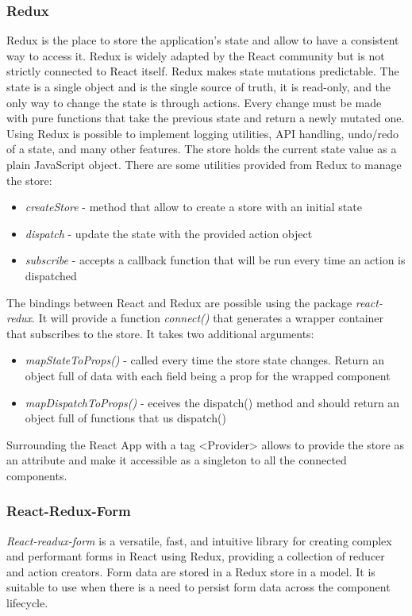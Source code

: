 \subsubsection*{Redux}
Redux is the place to store the application's state and allow to have a consistent way to access it. Redux is widely adapted by the React community but is not strictly connected to React itself. Redux makes state mutations predictable.
The state is a single object and is the single source of truth, it is read-only, and the only way to change the state is through actions. Every change must be made with pure functions that take the previous state and return a newly mutated one.
Using Redux is possible to implement logging utilities, API handling, undo/redo of a state, and many other features.  
The store holds the current state value as a plain JavaScript object. There are some utilities provided from Redux to manage the store:
\begin{itemize}
    \item \textit{createStore} - method that allow to create a store with an initial state
    \item \textit{dispatch} - update the state with the provided action object
    \item \textit{subscribe} - accepts a callback function that will be run every time an action is dispatched
\end{itemize}

The bindings between React and Redux are possible using the package \textit{react-redux}. It will provide a function \textit{connect()} that generates a wrapper container that subscribes to the store. It takes two additional arguments:
\begin{itemize}
    \item \textit{mapStateToProps()} - called every time the store state changes. Return an object full of data with each field being a prop for the wrapped component
    \item \textit{mapDispatchToProps()} - eceives the dispatch() method and should return an object full of functions that us dispatch()
\end{itemize}

Surrounding the React App with a tag <Provider> allows to provide the store as an attribute and make it accessible as a singleton to all the connected components.

\subsubsection*{React-Redux-Form}\textit{React-readux-form} is a versatile, fast, and intuitive library for creating complex and performant forms in React using Redux, providing a collection of reducer and action creators. Form data are stored in a Redux store in a model. It is suitable to use when there is a need to persist form data across the component lifecycle.

